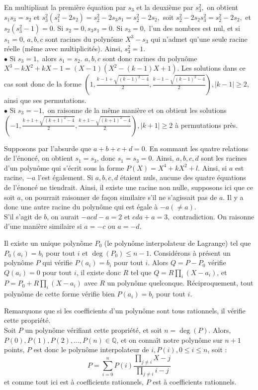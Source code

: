 \begin{sol}
En multipliant la première équation par $s_3$ et la deuxième par $s_3^2,$ on obtient $s_1s_3=s_2$ et $s_3^2(s_1^2-2s_2)=s_2^2-2s_3s_1=s_2^2-2s_2,$ soit $s_2^2-2s_2s_3^2=s_2^2-2s_2,$ et $s_2(s_3^2-1)=0.$ Si $s_2=0,s_3s_1=0.$ Si $s_3=0,$ l'un des nombres est nul, et si $s_1=0$, $a,b,c$ sont racines du polynôme $X^3-s_3$ qui n'admet qu'une seule racine réelle (même avec multiplicités). Ainsi, $s_3^2=1.$\\$\bullet$ Si $s_3=1,$ alors $s_1=s_2.$ $a,b,c$ sont donc racines du polynôme $X^3-kX^2+kX-1=(X-1)(X^2-(k-1)X+1).$ Les solutions dans ce cas sont donc de la forme $(1,\frac{k-1+\sqrt{(k-1)^2-4}}2,\frac{k-1-\sqrt{(k-1)^2-4}}2),|k-1|\ge 2,$ ainsi que ses permutations.\\
$\bullet$ Si $s_3=-1,$ on raisonne de la même manière et on obtient les solutions $(-1,\frac{k+1+\sqrt{(k+1)^2-4}}2,\frac{k+1-\sqrt{(k+1)^2-4}}2) ,|k+1|\ge 2$ à permutations près.
\end{sol}


\begin{sol}
Supposons par l'absurde que $a+b+c+d=0.$ En sommant les quatre relations de l'énoncé, on obtient $s_1=s_3$, donc $s_1=s_3=0.$ Ainsi, $a,b,c,d$ sont les racines d'un polynôme qui s'écrit sous la forme $P(X)=X^4+kX^2+l$. Ainsi, si $a$ est racine, $-a$ l'est également. Si $a,b,c,d$ étaient nuls, aucune des quatre équations de l'énoncé ne tiendrait. Ainsi, il existe une racine non nulle, supposons ici que ce soit $a$, on pourrait raisonner de façon similaire s'il ne s'agissait pas de $a$. Il y a donc une autre racine du polynôme qui est égale à $-a(\ne a)$.\\
S'il s'agit de $b$, on aurait $-acd-a=2$ et $cda+a=3,$ contradiction. On raisonne d'une manière similaire si $a=-c$ ou $a=-d.$
\end{sol}


\begin{sol}
Il existe un unique polynôme $P_0$ (le polynôme interpolateur de Lagrange) tel que $P_0(a_i)=b_i$ pour tout $i$ et $\deg(P_0)\le n-1$. Considérons à présent un polynôme $P$ qui vérifie $P(a_i)=b_i$ pour tout $i$. Alors $Q=P-P_0$ vérifie $Q(a_i)=0$ pour tout $i$, il existe donc $R$ tel que $Q=R\prod\limits_i (X-a_i)$, et $P=P_0+R\prod\limits_i (X-a_i)$ avec $R$ un polynôme quelconque. Réciproquement, tout polynôme de cette forme vérifie bien $P(a_i)=b_i$ pour tout $i$.
\end{sol}


\begin{sol}
Remarquons que si les coefficients d'un polynôme sont tous rationnels, il vérifie cette propriété. \\
Soit $P$ un polynôme vérifiant cette propriété, et soit $n=\deg(P).$ Alors, $P(0),P(1),P(2),\ldots,P(n)\in\mathbb Q$, et on connaît notre polynôme sur $n+1$ points, $P$ est donc le polynôme interpolateur de $i,P(i),0\le i\le n$, soit : $$P=\sum_{i=0}^nP(i)\frac{\prod\limits_{j\ne i}X-j}{\prod\limits_{j\ne i}i-j}$$et comme tout ici est à coefficients rationnels, $P$ est à coefficients rationnels.
\end{sol}
